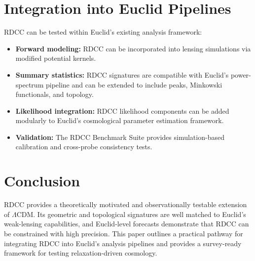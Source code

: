 \documentclass[11pt,a4paper]{article}
\begin{document}
\section{Integration into Euclid Pipelines}

RDCC can be tested within Euclid's existing analysis framework:

\begin{itemize}
    \item \textbf{Forward modeling:} RDCC can be incorporated into lensing 
    simulations via modified potential kernels.

    \item \textbf{Summary statistics:} RDCC signatures are compatible with 
    Euclid's power-spectrum pipeline and can be extended to include peaks, 
    Minkowski functionals, and topology.

    \item \textbf{Likelihood integration:} RDCC likelihood components can be 
    added modularly to Euclid's cosmological parameter estimation framework.

    \item \textbf{Validation:} The RDCC Benchmark Suite provides 
    simulation-based calibration and cross-probe consistency tests.
\end{itemize}
\section{Conclusion}

RDCC provides a theoretically motivated and observationally testable extension 
of $\Lambda$CDM. Its geometric and topological signatures are well matched to 
Euclid's weak-lensing capabilities, and Euclid-level forecasts demonstrate that 
RDCC can be constrained with high precision. This paper outlines a practical 
pathway for integrating RDCC into Euclid's analysis pipelines and provides a 
survey-ready framework for testing relaxation-driven cosmology.
\end{document}
